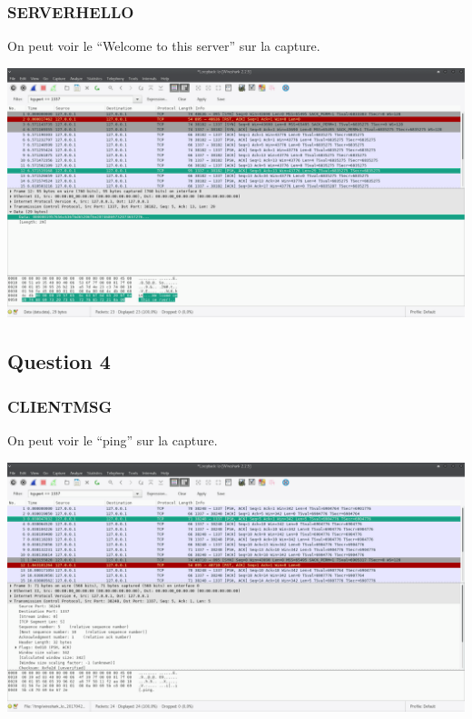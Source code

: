 \documentclass[10,a4paper]{article}
\begin{document}
\subsubsection*{SERVERHELLO}
On peut voir le ``Welcome to this server''  sur la capture.
\begin{center}
  \includegraphics[width=15cm]{exo1_3_serverhello.png}
\end{center}

\subsection*{Question 4}
\subsubsection*{CLIENTMSG}
On peut voir le ``ping'' sur la capture.
\begin{center}
  \includegraphics[width=15cm]{exo1_4_clientmsg.png}
\end{center}
\end{document}
